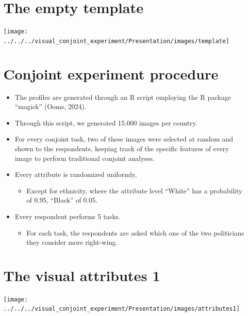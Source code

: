 \documentclass[
]{article}
\providecommand{\tightlist}{%
  \setlength{\itemsep}{0pt}\setlength{\parskip}{0pt}}
\begin{document}
\section{The empty template}\label{the-empty-template}

\begin{center}\texttt{[image: ../../../visual\_conjoint\_experiment/Presentation/images/template]} \end{center}

\section{Conjoint experiment
procedure}\label{conjoint-experiment-procedure}

\begin{itemize}
\tightlist
\item
  The profiles are generated through an R script employing the R package
  ``magick'' (Ooms, 2024).
\item
  Through this script, we generated 15.000 images per country.
\item
  For every conjoint task, two of these images were selected at random
  and shown to the respondents, keeping track of the specific features
  of every image to perform traditional conjoint analyses.
\item
  Every attribute is randomized uniformly,

  \begin{itemize}
  \tightlist
  \item
    Except for ethnicity, where the attribute level ``White'' has a
    probability of 0.95, ``Black'' of 0.05.
  \end{itemize}
\item
  Every respondent performs 5 tasks.

  \begin{itemize}
  \tightlist
  \item
    For each task, the respondents are asked which one of the two
    politicians they consider more right-wing.
  \end{itemize}
\end{itemize}

\section{The visual attributes 1}\label{the-visual-attributes-1}

\begin{center}\texttt{[image: ../../../visual\_conjoint\_experiment/Presentation/images/attributes1]} \end{center}
\end{document}
